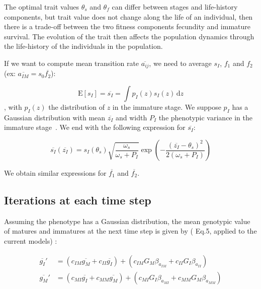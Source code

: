 The optimal trait values $\theta_s$ and $\theta_f$ can differ between stages and life-history components, but trait value does not change along the life of an individual, then there is a trade-off between the two fitness components fecundity and immature survival. The evolution of the trait then affects the population dynamics through the life-history of the individuals in the population.

If we want to compute mean transition rate $\overline{a_{ij}}$, we need to average $s_I$, $f_1$ and $f_2$ (ex: $\overline{a_{IM}} = s_0 \overline{f_2}$):

\begin{equation}
	\mathrm{E}[s_I] = \overline{s_I} = \int p_I(z)s_I(z)\,\text{d}z
\end{equation}
, with $p_I(z)$ the distribution of $z$ in the immature stage. We suppose $p_I$ has a Gaussian distribution with mean $\overline{z_I}$ and width $P_I$ the phenotypic variance in the immature stage~\citep{lande_quantitative_1982}. We end with the following expression for $\overline{s_I}$:

\begin{equation}
	\label{eq:poplht}
	\overline{s_{I}}(\overline{z_{I}}) = s_{I}(\theta_{s}) \sqrt{\frac{\omega_{s}}{\omega_{s}+P_{I}}}	\exp\left(-\frac{(\overline{z_{I}} - \theta_{s})^2}{2(\omega_{s}+P_{I})}\right)
\end{equation}

We obtain similar expressions for $\overline{f_1}$ and $\overline{f_2}$.	

\subsection*{Iterations at each time step}

Assuming the phenotype has a Gaussian distribution,  the mean genotypic value of matures and immatures at the next time step is given by (\citealt{barfield_evolution_2011} Eq.5, applied to the current models) :

\begin{subequations}
	\begin{align}
		\label{eq:genotypic}
		\overline{g_{I}}' &= (c_{I M} \overline{g_{M}} + c_{I I} \overline{g_{I}}) + 
			(c_{I M} G_M \beta_{a_{IM}} + c_{I I} G_I \beta_{a_{II}}) \\
		\overline{g_{M}}' &=	 (c_{M I} \overline{g_{I}} + c_{M M} \overline{g_{M}})  +
				(c_{M I} G_I \beta_{a_{MI}} + c_{M M} G_M \beta_{a_{MM}})
	\end{align}
\end{subequations}

